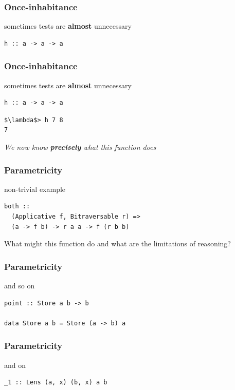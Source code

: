 \begin{frame}[fragile]
\frametitle{Once-inhabitance}
\begin{block}{sometimes tests are \textbf{almost} unnecessary}
\begin{lstlisting}
h :: a -> a -> a
\end{lstlisting}
\end{block}
\end{frame}

\begin{frame}[fragile]
\frametitle{Once-inhabitance}
\begin{block}{sometimes tests are \textbf{almost} unnecessary}
\begin{lstlisting}
h :: a -> a -> a
\end{lstlisting}
\end{block}
\begin{lstlisting}[mathescape]
$\lambda$> h 7 8
7
\end{lstlisting}
\emph{We now know \textbf{precisely} what this function does}
\end{frame}

\begin{frame}[fragile]
\frametitle{Parametricity}
\begin{block}{non-trivial example}
\begin{lstlisting}
both ::
  (Applicative f, Bitraversable r) =>
  (a -> f b) -> r a a -> f (r b b)
\end{lstlisting}
\end{block}
\begin{center}
What might this function do and what are the limitations of reasoning?
\end{center}
\end{frame}

\begin{frame}[fragile]
\frametitle{Parametricity}
\begin{block}{and so on}
\begin{lstlisting}
point :: Store a b -> b

data Store a b = Store (a -> b) a
\end{lstlisting}
\end{block}
\end{frame}

\begin{frame}[fragile]
\frametitle{Parametricity}
\begin{block}{and on}
\begin{lstlisting}
_1 :: Lens (a, x) (b, x) a b
\end{lstlisting}
\end{block}
\end{frame}

